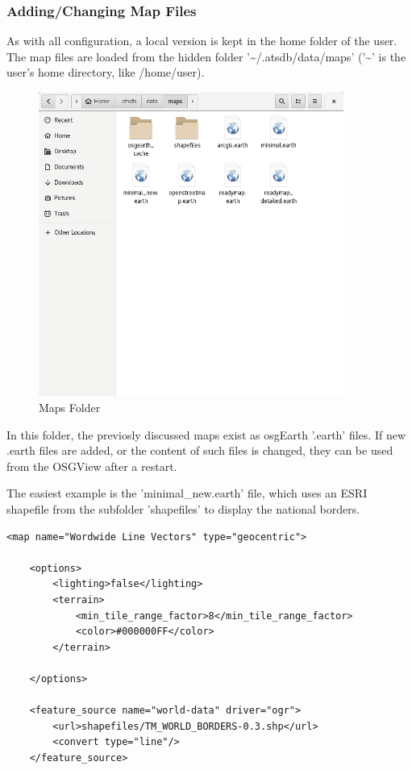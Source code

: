 {\subsubsection{Adding/Changing Map Files}
\label{sec:adding_maps}

As with all configuration, a local version is kept in the home folder of the user. The map files are loaded from the hidden folder '\textasciitilde/.atsdb/data/maps' ('\textasciitilde' is the user's home directory, like /home/user).

\begin{figure}[H]
    \includegraphics[width=10cm,frame]{../screenshots/maps_config.png}
  \caption{Maps Folder}
\end{figure}

In this folder, the previosly discussed maps exist as osgEarth '.earth' files. If new .earth files are added, or the content of such files is changed, they can be used from the OSGView after a restart.

The easiest example is the 'minimal\_new.earth' file, which uses an ESRI shapefile from the subfolder 'shapefiles' to display the national borders.

\begin{verbatim}
<map name="Wordwide Line Vectors" type="geocentric">
  
    <options>
        <lighting>false</lighting>
        <terrain>
            <min_tile_range_factor>8</min_tile_range_factor>
            <color>#000000FF</color>
        </terrain>
      
    </options>

    <feature_source name="world-data" driver="ogr">
        <url>shapefiles/TM_WORLD_BORDERS-0.3.shp</url>
        <convert type="line"/>
    </feature_source>
    

\end{verbatim}}
